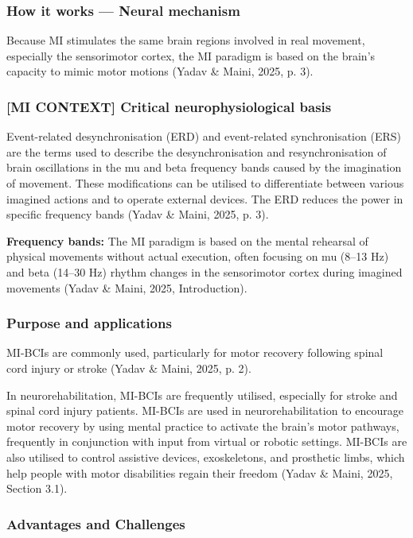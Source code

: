 \documentclass[12pt]{article}
\begin{document}
\subsubsection{How it works — Neural mechanism}

Because MI stimulates the same brain regions involved in real movement, especially the sensorimotor cortex, the MI paradigm is based on the brain's capacity to mimic motor motions (Yadav \& Maini, 2025, p. 3).

\subsubsection{[MI CONTEXT] Critical neurophysiological basis}

Event-related desynchronisation (ERD) and event-related synchronisation (ERS) are the terms used to describe the desynchronisation and resynchronisation of brain oscillations in the mu and beta frequency bands caused by the imagination of movement. These modifications can be utilised to differentiate between various imagined actions and to operate external devices. The ERD reduces the power in specific frequency bands (Yadav \& Maini, 2025, p. 3).

\textbf{Frequency bands:} The MI paradigm is based on the mental rehearsal of physical movements without actual execution, often focusing on mu (8–13 Hz) and beta (14–30 Hz) rhythm changes in the sensorimotor cortex during imagined movements (Yadav \& Maini, 2025, Introduction).

\subsubsection{Purpose and applications}

MI-BCIs are commonly used, particularly for motor recovery following spinal cord injury or stroke (Yadav \& Maini, 2025, p. 2).

In neurorehabilitation, MI-BCIs are frequently utilised, especially for stroke and spinal cord injury patients. MI-BCIs are used in neurorehabilitation to encourage motor recovery by using mental practice to activate the brain's motor pathways, frequently in conjunction with input from virtual or robotic settings. MI-BCIs are also utilised to control assistive devices, exoskeletons, and prosthetic limbs, which help people with motor disabilities regain their freedom (Yadav \& Maini, 2025, Section 3.1).

\subsubsection{Advantages and Challenges}
\end{document}

